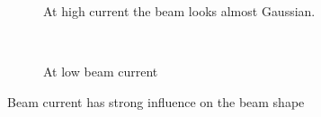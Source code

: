 \begin{figure}[!ht]
  \begin{subfigure}{0.5\textwidth}
    
    \caption{At high current the beam looks almost Gaussian.}
    \label{}
  \end{subfigure}
  ~
  \begin{subfigure}{0.5\textwidth}
    
    \caption{At low beam current}
    \label{}
  \end{subfigure}
  \caption[]{Beam current has strong influence on the beam shape}
  \label{chap4:ex_beam_profile}
\end{figure}
